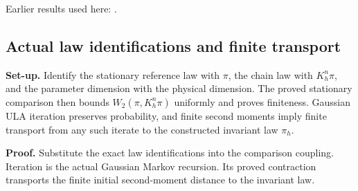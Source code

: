 \documentclass[11pt,a4paper]{report}
\begin{document}
Earlier results used here: \cite[Section~3.26]{LangevinLean2026ULASC}.
\subsection{\texorpdfstring{Actual law identifications and finite transport}{Actual law identifications and finite transport}}
\label{report-step-WassersteinMixing-ComparisonTheorems-lean-1}


\textbf{Set-up.} Identify the stationary reference law with \(\pi\), the chain law with \(K_h^n\pi\), and the parameter dimension with the physical dimension. The proved stationary comparison then bounds \(W_2(\pi,K_h^n\pi)\) uniformly and proves finiteness. Gaussian ULA iteration preserves probability, and finite second moments imply finite transport from any such iterate to the constructed invariant law \(\pi_h\).



\textbf{Proof.} Substitute the exact law identifications into the comparison coupling. Iteration is the actual Gaussian Markov recursion. Its proved contraction transports the finite initial second-moment distance to the invariant law.
\end{document}
